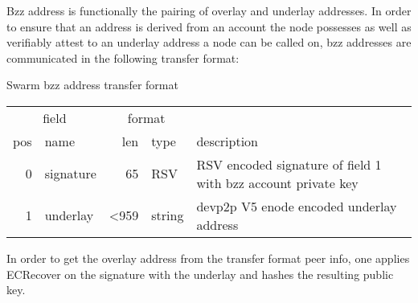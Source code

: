 Bzz address is functionally the pairing of overlay and underlay addresses. In order to ensure that an address is derived from an account the node possesses as well as verifiably attest to an underlay address a node can be called on, bzz addresses are communicated in the following transfer format:

\begin{definition}{Swarm bzz address transfer format} \label{def:bzz-address}

\begin{tabular}{r|l|r|l|l}
\multicolumn{2}{c|}{field}& 
\multicolumn{2}{c|}{format}& 
\\
pos & name  & len & type & description \\\hline
0  & signature & 65 & RSV & RSV encoded signature of field 1 with bzz account private key\\\hline
1  & underlay & <959 & string & devp2p V5 enode encoded underlay address
\end{tabular}
\end{definition}

In order to get the overlay address from the transfer format peer info, one applies ECRecover on the signature with the underlay and hashes the resulting public key. 
